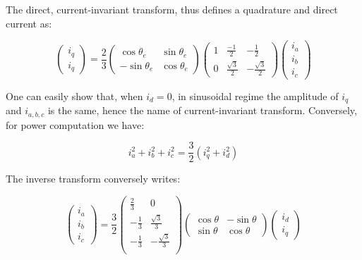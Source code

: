 \documentclass[a4paper,10pt]{article}
\begin{document}
The direct, current-invariant transform, thus defines a quadrature and direct current as:

\begin{equation}
	\begin{pmatrix}
		i_q \\
		i_q
	\end{pmatrix} = \frac{2}{3} \begin{pmatrix}
		\cos \theta_e & \sin \theta_e \\
		-\sin \theta_e & \cos \theta_e
	\end{pmatrix} \begin{pmatrix}
		1 & \frac{-1}{2} & - \frac{1}{2} \\
		0 & \frac{\sqrt{3}}{2}& - \frac{\sqrt{3}}{2}
	\end{pmatrix}
	\begin{pmatrix}
		i_a \\
		i_b \\
		i_c
	\end{pmatrix}
	\label{eCarkePark}
\end{equation}

One can easily show that, when $i_d = 0$, in sinusoidal regime the amplitude of $i_q$ and $i_{a,b,c}$ is the same, hence the name of current-invariant transform. Conversely, for power computation we have:

\begin{equation}
	i_a^2 + i_b^2 + i_c^2 = \frac{3}{2} (i_q^2 + i_d^2)
	\label{ePower}
\end{equation}

The inverse transform conversely writes:

\begin{equation}
	\begin{pmatrix}
		i_a \\
		i_b \\
		i_c
	\end{pmatrix} = 
	\frac{3}{2} \begin{pmatrix}
		\frac{2}{3} & 0 \\
		-\frac{1}{3} & \frac{\sqrt{3}}{3} \\
		-\frac{1}{3} & -\frac{\sqrt{3}}{3} \\
	\end{pmatrix}
	\begin{pmatrix}
		\cos \theta & -\sin \theta \\
		\sin \theta & \cos \theta
	\end{pmatrix}
	\begin{pmatrix}
		i_d \\
		i_q
	\end{pmatrix} 
	\label{eClarkeParkInverse}
\end{equation}
\end{document}
